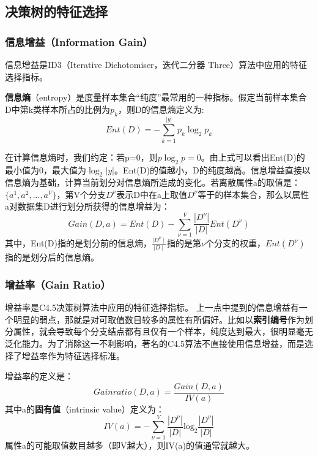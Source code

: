 \subsection{决策树的特征选择}
\subsubsection{\textbf{信息增益}（Information Gain）}
信息增益是ID3（Iterative Dichotomiser，迭代二分器 Three）算法中应用的特征选择指标。

\textbf{信息熵}（entropy）是度量样本集合“纯度”最常用的一种指标。假定当前样本集合D中第k类样本所占的比例为$p_{k}$，则D的信息熵定义为:
\setcounter{equation}{0} %
\begin{equation}Ent(D)=-\sum_{k=1}^{|y|}p_k\log_2p_k\end{equation}

在计算信息熵时，我们约定：若p=0，则$p\log_2p=0$。由上式可以看出Ent(D)的最小值为0，最大值为$\log_2|y|$。Ent(D)的值越小，D的纯度越高。信息增益直接以信息熵为基础，计算当前划分对信息熵所造成的变化。若离散属性a的取值是：$\{a^1,a^2,...,a^V\}$，第V个分支$D^{\nu}$表示D中在a上取值$D^{\nu}$等于的样本集合，那么以属性a对数据集D进行划分所获得的信息增益为：
\begin{equation}Gain(D,a)=Ent(D)-\sum_{\nu=1}^V\frac{|D^\nu|}{|D|}Ent(D^\nu)\end{equation}
其中，Ent(D)指的是划分前的信息熵，$\frac{\mid D^\nu\mid}{\mid D\mid}$指的是第$\nu$个分支的权重，$Ent(D^\nu)$指的是划分后的信息熵。
\subsubsection{\textbf{增益率}（Gain Ratio）}
增益率是C4.5决策树算法中应用的特征选择指标。
上一点中提到的信息增益有一个明显的弱点，那就是对可取值数目较多的属性有所偏好。比如以\textbf{索引编号}作为划分属性，就会导致每个分支结点都有且仅有一个样本，纯度达到最大，很明显毫无泛化能力。为了消除这一不利影响，著名的C4.5算法不直接使用信息增益，而是选择了增益率作为特征选择标准。

增益率的定义是：
\begin{equation}Gainratio(D,a)=\frac{Gain(D,a)}{IV(a)}\end{equation}
其中a的\textbf{固有值}（intrinsic value）定义为：
\begin{equation}IV(a)=-\sum_{\nu=1}^V\frac{|D^\nu|}{|D|}\mathrm{log}_2\frac{|D^\nu|}{|D|}\end{equation}
属性a的可能取值数目越多（即V越大），则IV(a)的值通常就越大。

